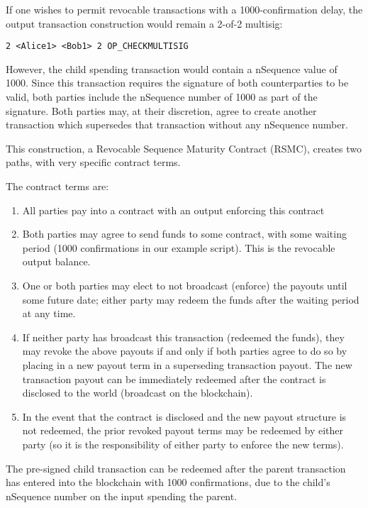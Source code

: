 \documentclass[letterpaper,11pt]{article}
\begin{document}
If one wishes to permit revocable transactions with a 1000-confirmation delay,
the output transaction construction would remain a 2-of-2 multisig:

\begin{lstlisting}
2 <Alice1> <Bob1> 2 OP_CHECKMULTISIG
\end{lstlisting}

However, the child spending transaction would contain a nSequence value of 1000.
Since this transaction requires the signature of both counterparties to be
valid, both parties include the nSequence number of 1000 as part of the
signature. Both parties may, at their discretion, agree to create another
transaction which supersedes that transaction without any nSequence number.

This construction, a Revocable Sequence Maturity Contract (RSMC), creates
two paths, with very specific contract terms. 

The contract terms are:
\begin{enumerate}
	\item All parties pay into a contract with an output enforcing this
		contract
	\item Both parties may agree to send funds to some contract, with some
		waiting period (1000 confirmations in our example script). This
		is the revocable output balance.
	\item One or both parties may elect to not broadcast (enforce) the
		payouts until some future date; either party may redeem the
		funds after the waiting period at any time.
	\item If neither party has broadcast this transaction (redeemed the
		funds), they may revoke the above payouts if and only if both
		parties agree to do so by placing in a new payout term in a
		superseding transaction payout. The new transaction payout can
		be immediately redeemed after the contract is disclosed to the
		world (broadcast on the blockchain).
	\item In the event that the contract is disclosed and the new payout
		structure is not redeemed, the prior revoked payout terms may be
		redeemed by either party (so it is the responsibility of either
		party to enforce the new terms).
\end{enumerate}

The pre-signed child transaction can be redeemed after the parent transaction
has entered into the blockchain with 1000 confirmations, due to the child's
nSequence number on the input spending the parent.
\end{document}
